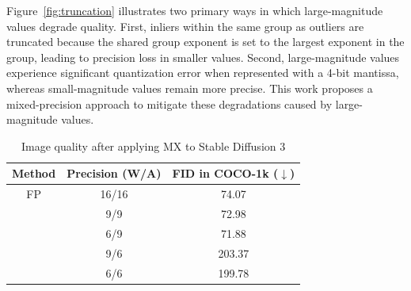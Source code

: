 %
%
Figure~\ref{fig:truncation} illustrates two primary ways in which large-magnitude values degrade quality.
%
First, inliers within the same group as outliers are truncated because the shared group exponent is set to the largest exponent in the group, leading to precision loss in smaller values.
%
Second, large-magnitude values experience significant quantization error when represented with a 4-bit mantissa, whereas small-magnitude values remain more precise.
%
This work proposes a mixed-precision approach to mitigate these degradations caused by large-magnitude values.
%




\begin{table}[t]
\centering
\footnotesize
\caption{Image quality after applying MX to Stable Diffusion 3}
\label{tab:mx-degrade}
\begin{tabular}{ccc} 
\hline
Method              & Precision (W/A) & FID in COCO-1k ($\downarrow$)  \\ 
\hline
FP                  & 16/16           & 74.07                       \\
\hdashline[1pt/1pt]
\multirow{4}{*}{MX} & 9/9             & 72.98                       \\
                    & 6/9             & 71.88                       \\
                    & 9/6             & 203.37                      \\
                    & 6/6             & 199.78                      \\
\hline
\end{tabular}
\end{table}


